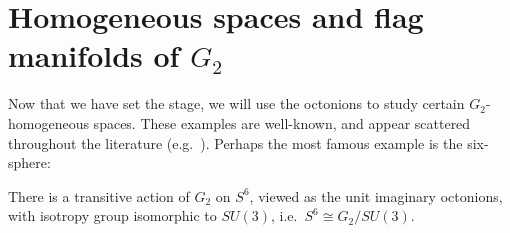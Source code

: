 \section{Homogeneous spaces and flag manifolds of \texorpdfstring{$G_2$}{G2}}

Now that we have set the stage, we will use the octonions to study certain $G_2$-homogeneous spaces. These examples are well-known, and appear scattered throughout the literature (e.g.~\cite{Ker1996,SW2015,Bry1982}). Perhaps the most famous example is the six-sphere:

\begin{prop}\label{prop:G2S6}
	There is a transitive action of $G_2$ on $S^6$, viewed as the unit imaginary octonions, with isotropy group isomorphic to $SU(3)$, i.e.~$S^6\cong G_2/SU(3)$.
\end{prop}
